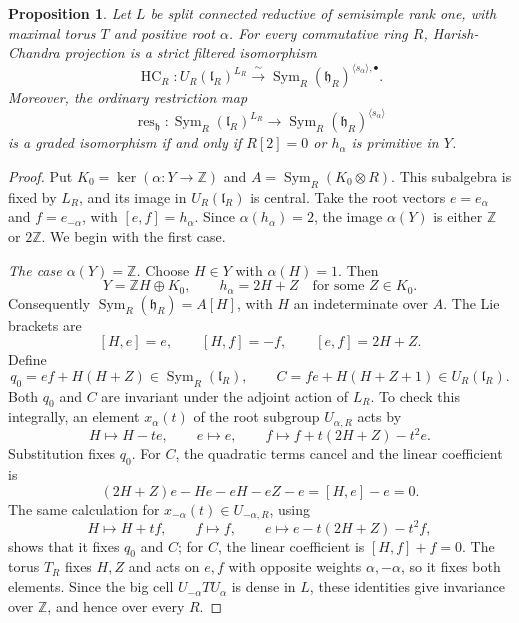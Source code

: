 \documentclass[twoside,a4paper,12pt,reqno]{amsart}
\newtheorem{proposition}[theorem]{Proposition}
\theoremstyle{remark}
\numberwithin{equation}{section}
\newcommand{\Z}{\mathbb Z}
\newcommand{\fh}{\mathfrak h}
\newcommand{\fl}{\mathfrak l}
\DeclareMathOperator{\Sym}{Sym}
\DeclareMathOperator{\HC}{HC}
\newcommand{\iso}{\xrightarrow{\ \sim\ }}
\begin{document}
\begin{proposition}\label{prop:rankone}
Let \(L\) be split connected reductive of semisimple rank one,
with maximal torus \(T\) and positive root \(\alpha\).
For every commutative ring \(R\), Harish-Chandra projection is a
strict filtered isomorphism
\[
\HC_R:U_R(\fl_R)^{L_R}\iso
\Sym_R(\fh_R)^{\langle s_\alpha\rangle,\bullet}.
\]
Moreover, the ordinary restriction map
\[
\operatorname{res}_{\fh}:\Sym_R(\fl_R)^{L_R}
\longrightarrow \Sym_R(\fh_R)^{\langle s_\alpha\rangle}
\]
is a graded isomorphism if and only if \(R[2]=0\) or \(h_\alpha\)
is primitive in \(Y\).
\end{proposition}
\begin{proof}
Put \(K_0=\ker(\alpha:Y\to\Z)\) and
\(A=\Sym_R(K_0\otimes R)\). This subalgebra is fixed by \(L_R\),
and its image in \(U_R(\fl_R)\) is central.
Take the root vectors \(e=e_\alpha\) and \(f=e_{-\alpha}\), with
\([e,f]=h_\alpha\).
Since \(\alpha(h_\alpha)=2\), the image \(\alpha(Y)\) is either
\(\Z\) or \(2\Z\). We begin with the first case.

\smallskip
\noindent\emph{The case \(\alpha(Y)=\Z\).}
Choose \(H\in Y\) with \(\alpha(H)=1\). Then
\[
Y=\Z H\oplus K_0,\qquad h_\alpha=2H+Z
\quad\text{for some }Z\in K_0.
\]
Consequently \(\Sym_R(\fh_R)=A[H]\), with \(H\) an indeterminate
over \(A\). The Lie brackets are
\[
[H,e]=e,\qquad [H,f]=-f,\qquad [e,f]=2H+Z.
\]
Define
\[
q_0=ef+H(H+Z)\in\Sym_R(\fl_R),\qquad
C=fe+H(H+Z+1)\in U_R(\fl_R).
\]
Both \(q_0\) and \(C\) are invariant under the adjoint action of \(L_R\).
To check this integrally, an element \(x_\alpha(t)\) of the root subgroup
\(U_{\alpha,R}\) acts by
\[
H\longmapsto H-te,\qquad e\longmapsto e,\qquad
f\longmapsto f+t(2H+Z)-t^2e.
\]
Substitution fixes \(q_0\). For \(C\), the quadratic terms cancel
and the linear coefficient is
\[
(2H+Z)e-He-eH-eZ-e=[H,e]-e=0.
\]
The same calculation for \(x_{-\alpha}(t)\in U_{-\alpha,R}\), using
\[
H\longmapsto H+tf,\qquad f\longmapsto f,\qquad
e\longmapsto e-t(2H+Z)-t^2f,
\]
shows that it fixes \(q_0\) and \(C\); for \(C\), the linear coefficient
is \([H,f]+f=0\). The torus \(T_R\) fixes \(H,Z\) and acts on \(e,f\)
with opposite weights \(\alpha,-\alpha\), so it fixes both elements.
Since the big cell \(U_{-\alpha}TU_\alpha\) is dense
in \(L\), these identities give invariance over \(\Z\), and hence
over every \(R\).


\end{proof}
\end{document}
